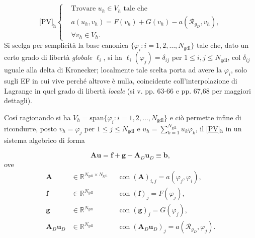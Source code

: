 \documentclass{article}
\newcommand{\Ngdl}{N_{\text{gdl}}}
\newcommand{\SpaziaturaMate}[3]{
    \setlength{\thinmuskip}{#1mu}
    \setlength{\medmuskip}{#2mu}
    \setlength{\thickmuskip}{#3mu}
}
\newcommand{\teqref}[2]{\hyperref[#1]{#2}}
\begin{document}
            {\SpaziaturaMate{1}{2}{3}
            \begin{equation}
                \text{[PV]}_\text{h}
                \left\{
                \begin{aligned}
                    &\text{Trovare } u_h \in V_h \text{ tale che}\\[5pt]
                    &a(u_h,v_h)=F(v_h)+G(v_h)-a(\mathcal R_{g_D},v_h),\\[5pt]
                    &\forall v_h\in V_h.
                \end{aligned}
                \right.
                \label{eqPSVariazionaleDiscreto}
            \end{equation}
            Si scelga per semplicità la base canonica $\{\varphi_i\colon i=1,2,\ldots,\Ngdl\}$ tale che, dato un certo grado di libertà \textit{globale} $\ell_i$, si ha $\ell_i(\varphi_j)=\delta_{ij}$ per $1\le i,j\le \Ngdl$, col $\delta_{ij}$ uguale alla delta di Kronecker; localmente tale scelta porta ad avere la $\varphi_i$, solo sugli EF in cui vive perché altrove è nulla, coincidente coll'interpolazione di Lagrange in quel grado di libertà \textit{locale} (si v. \cite{dispenseMEDèPA} pp. 63-66 e pp. 67,68 per maggiori dettagli).

            Cosí ragionando si ha $V_h=\text{span}\{\varphi_i\colon i=1,2,\ldots,\Ngdl\}$ e ciò permette infine di ricondurre, posto $v_h=\varphi_j$ per $1\le j\le \Ngdl$ e $u_h=\sum_{k=1}^{\Ngdl}u_k\varphi_k$, il \teqref{eqPSVariazionaleDiscreto}{[PV]$_\text{h}$} in un sistema algebrico di forma}
            \begin{equation}
                \mathbf A\mathbf u=\mathbf f+\mathbf g-\mathbf A_D\mathbf u_D\equiv\mathbf b,
                \label{eqSistemaAlgebrico}
            \end{equation}
            ove
            \begin{equation}
                \begin{aligned}
                    \mathbf A&\in\mathbb R^{\Ngdl\times\Ngdl}
                    &&\text{con}\;(\mathbf A)_{i,j}=a(\varphi_j,\varphi_i),\\
                    \mathbf f&\in\mathbb R^{\Ngdl}
                    &&\text{con}\;(\mathbf f)_j=F(\varphi_j),\\
                    \mathbf g&\in\mathbb R^{\Ngdl}
                    &&\text{con}\;(\mathbf g)_j=G(\varphi_j),\\
                    \mathbf A_D\mathbf u_D&\in\mathbb R^{\Ngdl}
                    &&\text{con}\;(\mathbf A_D\mathbf u_D)_j=a(\mathcal R_{g_D},\varphi_j).
                \end{aligned}
                \label{eqSistemaAlgebricoDefinizioneMatrici}
            \end{equation}
\end{document}
